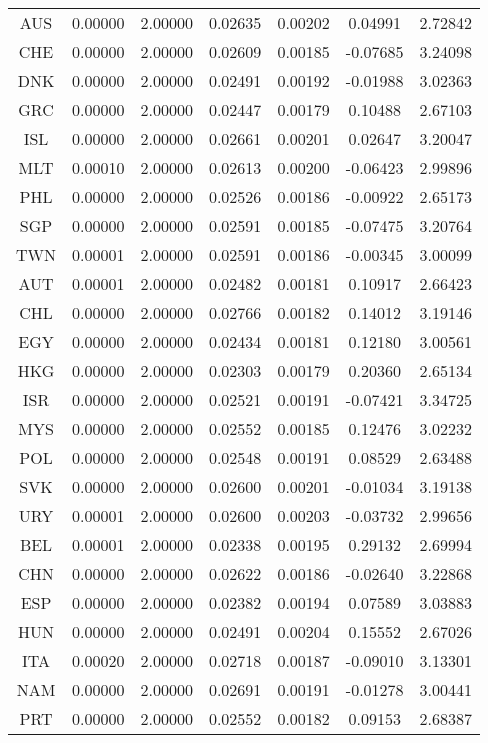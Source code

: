 \begin{longtable}{c c c c c c c}
AUS & 0.00000 & 2.00000 & 0.02635 & 0.00202 & 0.04991 & 2.72842 \\
CHE & 0.00000 & 2.00000 & 0.02609 & 0.00185 & -0.07685 & 3.24098 \\
DNK & 0.00000 & 2.00000 & 0.02491 & 0.00192 & -0.01988 & 3.02363 \\
GRC & 0.00000 & 2.00000 & 0.02447 & 0.00179 & 0.10488 & 2.67103 \\
ISL & 0.00000 & 2.00000 & 0.02661 & 0.00201 & 0.02647 & 3.20047 \\
MLT & 0.00010 & 2.00000 & 0.02613 & 0.00200 & -0.06423 & 2.99896 \\
PHL & 0.00000 & 2.00000 & 0.02526 & 0.00186 & -0.00922 & 2.65173 \\
SGP & 0.00000 & 2.00000 & 0.02591 & 0.00185 & -0.07475 & 3.20764 \\
TWN & 0.00001 & 2.00000 & 0.02591 & 0.00186 & -0.00345 & 3.00099 \\
AUT & 0.00001 & 2.00000 & 0.02482 & 0.00181 & 0.10917 & 2.66423 \\
CHL & 0.00000 & 2.00000 & 0.02766 & 0.00182 & 0.14012 & 3.19146 \\
EGY & 0.00000 & 2.00000 & 0.02434 & 0.00181 & 0.12180 & 3.00561 \\
HKG & 0.00000 & 2.00000 & 0.02303 & 0.00179 & 0.20360 & 2.65134 \\
ISR & 0.00000 & 2.00000 & 0.02521 & 0.00191 & -0.07421 & 3.34725 \\
MYS & 0.00000 & 2.00000 & 0.02552 & 0.00185 & 0.12476 & 3.02232 \\
POL & 0.00000 & 2.00000 & 0.02548 & 0.00191 & 0.08529 & 2.63488 \\
SVK & 0.00000 & 2.00000 & 0.02600 & 0.00201 & -0.01034 & 3.19138 \\
URY & 0.00001 & 2.00000 & 0.02600 & 0.00203 & -0.03732 & 2.99656 \\
BEL & 0.00001 & 2.00000 & 0.02338 & 0.00195 & 0.29132 & 2.69994 \\
CHN & 0.00000 & 2.00000 & 0.02622 & 0.00186 & -0.02640 & 3.22868 \\
ESP & 0.00000 & 2.00000 & 0.02382 & 0.00194 & 0.07589 & 3.03883 \\
HUN & 0.00000 & 2.00000 & 0.02491 & 0.00204 & 0.15552 & 2.67026 \\
ITA & 0.00020 & 2.00000 & 0.02718 & 0.00187 & -0.09010 & 3.13301 \\
NAM & 0.00000 & 2.00000 & 0.02691 & 0.00191 & -0.01278 & 3.00441 \\
PRT & 0.00000 & 2.00000 & 0.02552 & 0.00182 & 0.09153 & 2.68387 \\

\end{longtable}
